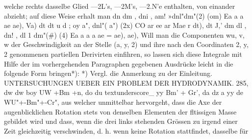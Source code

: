 \documentclass[11pt]{article}
\begin{document}
welche rechts dasselbe Glied —2L’s, —2M’s, —2.N’e enthalten, von einander abzieht; auf
diese Weise erhalt man dn dm , dni , am! »dnl"dm"(2) (om) Ea a a ae ae), Va) dt dt
u d ; oy a", dnl"( a") (2x) CO ar ee ar Mae r dt), dt J,’ dm dl , dn! , dl 1 dm"(\#) (4)
Ea a a a ae = ae), ae), Will man die Componenten wu, v, w der Geschwindigkeit an der
Stelle (a, y, 2) und ihre nach den Coordinaten 2, y, 2 genommenen partiellen Derivirten
einfihren, so lassen sich diese Integrale mit Hilfe der im vorhergehenden Paragraphen
gegebenen Ausdrücke leicht in die folgende Form bringen*): *) Vergl. die Anmerkung zu
der Einleitung.
UNTERSUCHUNGEN UEBER EIN PROBLEM DER HYDRODYNAMIK. 285, dw
dw boy UW +Bm +n, do du
textunderscore\_ yy Bm’ + Gr’, da dz a yy de WU"+-Bm"+-Cr", aus welcher unmittelbar
hervorgeht, dass die Axe der augenblicklichen Rotation stets von denselben Elementen der
fltissigen Masse gebildet wird und dass, wenn die drei links stehenden Grössen zu irgend
einer Zeit gleichzeitig verschwinden, d. h. wenn keine Rotation stattfindet, dasselbe für
\end{document}
